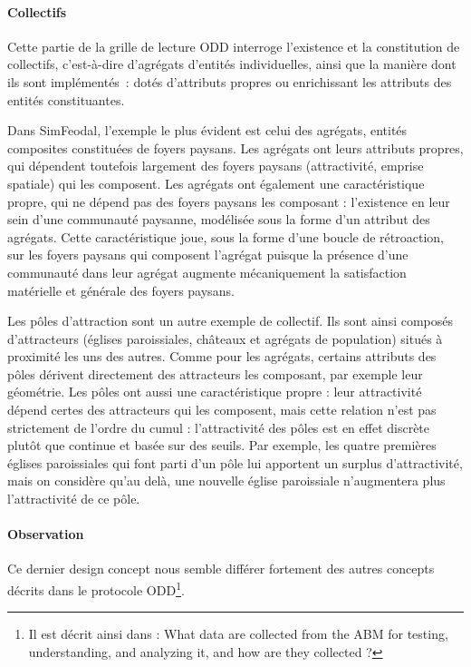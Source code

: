 \paragraph{Collectifs} Cette partie de la grille de lecture ODD interroge l'existence et la constitution de \og collectifs\fg{}, c'est-à-dire d'agrégats d'entités individuelles, ainsi que la manière dont ils sont implémentés : dotés
d'attributs propres ou enrichissant les attributs des entités constituantes.


Dans SimFeodal, l'exemple le plus évident est celui des agrégats, entités composites constituées de foyers paysans.
Les agrégats ont leurs attributs propres, qui dépendent toutefois largement des foyers paysans (attractivité, emprise spatiale) qui les composent.
Les agrégats ont également une caractéristique propre, qui ne dépend pas des foyers paysans les composant : l'existence en leur sein d'une communauté paysanne, modélisée sous la forme d'un attribut des agrégats.
Cette caractéristique joue, sous la forme d'une boucle de rétroaction, sur les foyers paysans qui composent l'agrégat puisque la présence d'une communauté dans leur agrégat augmente mécaniquement la satisfaction matérielle et générale des foyers paysans.

Les pôles d'attraction sont un autre exemple de collectif.
Ils sont ainsi composés d'attracteurs (églises paroissiales, châteaux et agrégats de population) situés à proximité les uns des autres.
Comme pour les agrégats, certains attributs des pôles dérivent directement des attracteurs les composant, par exemple leur géométrie.
Les pôles ont aussi une caractéristique propre : leur attractivité dépend certes des attracteurs qui les composent, mais cette relation n'est pas strictement de l'ordre du cumul : l'attractivité des pôles est en effet discrète plutôt que continue et basée sur des seuils.
Par exemple, les quatre premières églises paroissiales qui font parti d'un pôle lui apportent un surplus d'attractivité, mais on considère qu'au delà, une nouvelle église paroissiale n'augmentera plus l'attractivité de ce pôle.


\paragraph{Observation} Ce dernier \og design concept\fg{} nous semble différer fortement des autres concepts décrits dans le protocole ODD\footnote{
Il est décrit ainsi dans \textcite[354]{grimm_documenting_2017} :
\og What data are collected from the ABM for testing, understanding, and analyzing it, and how are they collected ? \fg{}
}.

